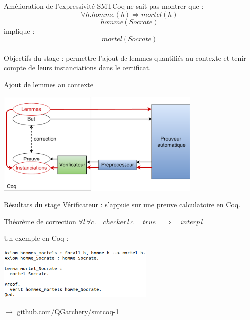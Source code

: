 \documentclass{beamer}
\begin{document}
\begin{frame}{Amélioration de l'expressivité}
SMTCoq ne sait pas montrer que :
\[\forall h. homme(h) \Rightarrow mortel(h)\]
\[homme(Socrate)\]
implique :
\[mortel(Socrate)\]
\vspace*{2mm} \\
Objectifs du stage : permettre l'ajout de lemmes quantifiés au contexte et tenir compte de leurs instanciations dans le certificat.
\vspace*{6mm}\\
\end{frame}

\begin{frame}{Ajout de lemmes au contexte}
\begin{center}
\includegraphics[height=5cm]{3_Contrib_Stage.pdf}
\end{center}
\end{frame}

\begin{frame}{Résultats du stage}
Vérificateur : s'appuie sur une preuve calculatoire en Coq. \\

\begin{block}{Théorème de correction}
$\forall l \, \forall c. \quad checker \, l \, c = true \quad \Rightarrow \quad interp \, l$
\end{block}
\vspace{3mm}
Un exemple en Coq :
\begin{center}
\includegraphics[height=2.5cm]{4_Socrate.png}
\end{center}
\vspace{3mm}
$\longrightarrow $ github.com/QGarchery/smtcoq-1
\end{frame}
\end{document}
